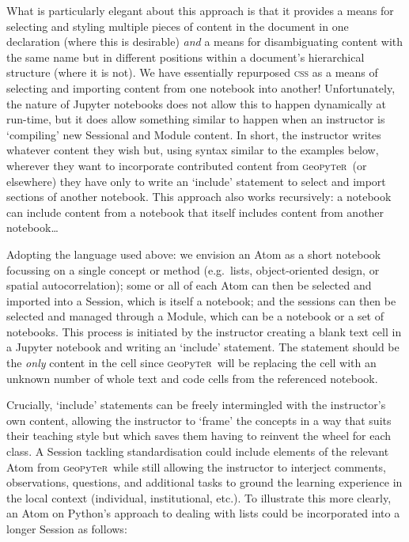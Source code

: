 \documentclass[letter, 11pt]{article}
\newcommand{\gp}{\textsc{g}eo\textsc{p}y\textsc{t}e\textsc{r}~\/}
\newcommand{\eg}{e.g.~\/}
\begin{document}
What is particularly elegant about this approach is that it provides a means for
selecting and styling multiple pieces of content in the document in one
declaration (where this is desirable) \textit{and} a means for disambiguating
content with the same name but in different positions within a document's
hierarchical structure (where it is not). We have essentially repurposed
\textsc{css} as a means of selecting and importing content from one notebook
into another! Unfortunately, the nature of Jupyter notebooks does not allow this
to happen dynamically at run-time, but it does allow something similar to happen
when an instructor is `compiling' new Sessional and Module content. In short,
the instructor writes whatever content they wish but, using syntax similar to
the examples below, wherever they want to incorporate contributed content from
\gp (or elsewhere) they have only to write an `include' statement to select and
import sections of another notebook. This approach also works recursively: a
notebook can include content from a notebook that itself includes content from
another notebook\ldots

Adopting the language used above: we envision an Atom as a short notebook
focussing on a single concept or method (\eg lists, object-oriented design, or
spatial autocorrelation); some or all of each Atom can then be selected and
imported into a Session, which is itself a notebook; and the sessions can then
be selected and managed through a Module, which can be a notebook or a set of
notebooks. This process is initiated by the instructor creating a blank text
cell in a Jupyter notebook and writing an `include' statement. The statement
should be the \textit{only} content in the cell since \gp will be replacing the
cell with an unknown number of whole text and code cells from the referenced
notebook.

Crucially, `include' statements can be freely intermingled with the instructor's
own content, allowing the instructor to `frame' the concepts in a way that suits
their teaching style but which saves them having to reinvent the wheel for each
class. A Session tackling standardisation could include elements of the relevant
Atom from \gp while still allowing the instructor to interject comments,
observations, questions, and additional tasks to ground the learning experience
in the local context (individual, institutional, etc.). To illustrate this more
clearly, an Atom on Python's approach to dealing with lists could be
incorporated into a longer Session as follows:
\end{document}
